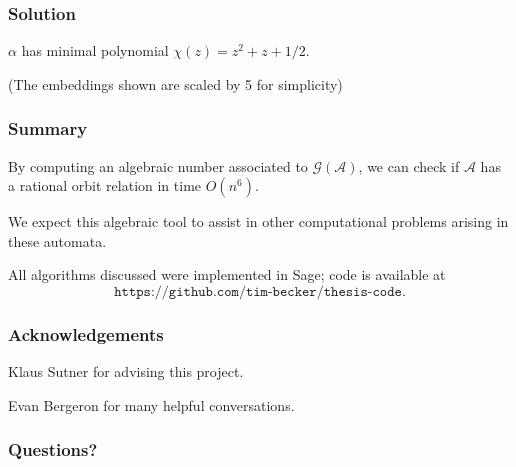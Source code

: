 \documentclass{beamer}
\newcommand{\A}{\mathcal{A}}
\newcommand{\gp}{\mathcal{G}}
\newcommand{\codeurl}{\texttt{https://github.com/tim-becker/thesis-code}}
\begin{document}
\begin{frame}
    \frametitle{Solution}
    $\alpha$ has minimal polynomial $\chi(z) = z^2 + z + 1/2$.
    \vspace{.5cm}
    \begin{center}
    \end{center}
    \tiny{(The embeddings shown are scaled by 5 for simplicity)}
\end{frame}

\begin{frame}
    \frametitle{Summary}
    By computing an algebraic number associated to $\gp(\A)$, we can check if
    $\A$ has a rational orbit relation in time $O(n^6)$.
    \pause

    \vspace{.5cm}
    We expect this algebraic tool to assist in other computational problems
    arising in these automata.

    \pause
    \vspace{.5cm}
    All algorithms discussed were implemented in Sage; code is available at
    \[
        \codeurl.
    \]
\end{frame}

\begin{frame}
    \frametitle{Acknowledgements}

    Klaus Sutner for advising this project.

    \vspace{.8cm}

    Evan Bergeron for many helpful conversations.
\end{frame}

\begin{frame}
    \frametitle{Questions?}
\end{frame}
\end{document}
